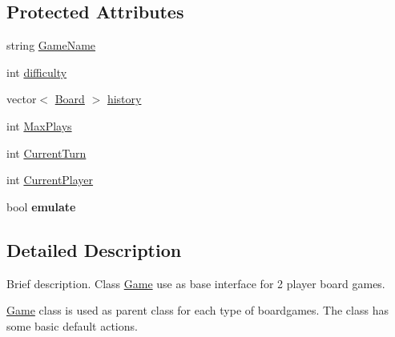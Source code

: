 \subsection*{Protected Attributes}
\begin{DoxyCompactItemize}
\item 
string \hyperlink{class_game_a1b56d5db37d900da0911378cc01f4cad}{Game\-Name}
\item 
int \hyperlink{class_game_a536a6390d16f05d402928bd731e06ef3}{difficulty}
\item 
vector$<$ \hyperlink{class_board}{Board} $>$ \hyperlink{class_game_a7c0dd74fa2e5c366638596b7e82428f1}{history}
\item 
int \hyperlink{class_game_a53cb9be6604469db6b3abac24c5a2ab6}{Max\-Plays}
\item 
int \hyperlink{class_game_a88700a4643e08b12130ba2950c54ed8b}{Current\-Turn}
\item 
int \hyperlink{class_game_a661282d67a0e4a972293c98478bc02e4}{Current\-Player}
\item 
\hypertarget{class_game_acb49030e7428e7e8edcca3e4cf05b630}{bool {\bfseries emulate}}\label{class_game_acb49030e7428e7e8edcca3e4cf05b630}

\end{DoxyCompactItemize}


\subsection{Detailed Description}
Brief description. Class \hyperlink{class_game}{Game} use as base interface for 2 player board games. 

\hyperlink{class_game}{Game} class is used as parent class for each type of boardgames. The class has some basic default actions. 

